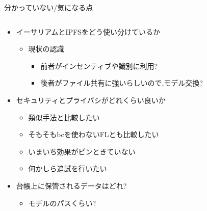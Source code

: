\documentclass[unicode,12pt,aspectratio=169, dvipdfmx]{beamer}
\begin{document}
    \begin{frame}{分かっていない/気になる点}
        \begin{columns}
            \begin{column}{.8\linewidth}
                \begin{itemize}
                    \item イーサリアムとIPFSをどう使い分けているか
                    \begin{itemize}
                        \item 現状の認識
                        \begin{itemize}
                            \item 前者がインセンティブや識別に利用?
                            \item 後者がファイル共有に強いらしいので,モデル交換?
                        \end{itemize}
                    \end{itemize}
                    \item セキュリティとプライバシがどれくらい良いか
                    \begin{itemize}
                        \item 類似手法と比較したい
                        \item そもそもbcを使わないFLとも比較したい
                        \item いまいち効果がピンときていない
                        \item 何かしら追試を行いたい
                    \end{itemize}
                    \item 台帳上に保管されるデータはどれ?
                    \begin{itemize}
                        \item モデルのパスくらい?
                    \end{itemize}
                \end{itemize}          
            \end{column}
        \end{columns}
    \end{frame}
\end{document}
